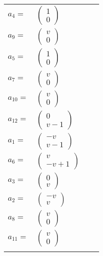 \documentclass[1p]{elsarticle_modified}
\theoremstyle{definition}
\begin{document}
\begin{tabular}{m{7pt} m{180pt} m{7pt} m{180pt} }
\flushright $a_{4}=$&$\begin{pmatrix}1\\0\end{pmatrix}$ \\
\flushright $a_{9}=$&$\begin{pmatrix}v\\0\end{pmatrix}$ \\
\flushright $a_{5}=$&$\begin{pmatrix}1\\0\end{pmatrix}$ \\
\flushright $a_{7}=$&$\begin{pmatrix}v\\0\end{pmatrix}$ \\
\flushright $a_{10}=$&$\begin{pmatrix}v\\0\end{pmatrix}$ \\
\flushright $a_{12}=$&$\begin{pmatrix}0\\v-1\end{pmatrix}$ \\
\flushright $a_{1}=$&$\begin{pmatrix}- v\\v-1\end{pmatrix}$ \\
\flushright $a_{6}=$&$\begin{pmatrix}v\\- v+1\end{pmatrix}$ \\
\flushright $a_{3}=$&$\begin{pmatrix}0\\v\end{pmatrix}$ \\
\flushright $a_{2}=$&$\begin{pmatrix}- v\\v\end{pmatrix}$ \\
\flushright $a_{8}=$&$\begin{pmatrix}v\\0\end{pmatrix}$ \\
\flushright $a_{11}=$&$\begin{pmatrix}v\\0\end{pmatrix}$\\&\end{tabular}
\end{document}

